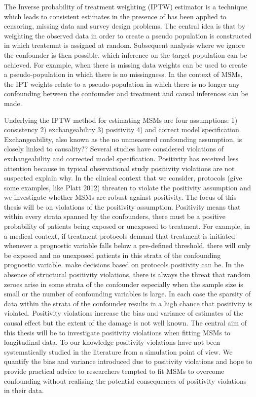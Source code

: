 \documentclass[11pt]{article}
\begin{document}
The Inverse probability of treatment weighting (IPTW) estimator is a
technique which leads to consistent estimates in the presence of has
been applied to censoring, missing data and survey design problems. The
central idea is that by weighting the observed data in order to create a
pseudo population is constructed in which treatemnt is assigned at
random. Subsequent analysis where we ignore the confounder is then
possible. which inference on the target population can be achieved. For
example, when there is missing data weights can be used to create a
pseudo-population in which there is no missingness. In the context of
MSMs, the IPT weights relate to a pseudo-population in which there is no
longer any confounding between the confounder and treatment and causal
inferences can be made. \linebreak

Underlying the IPTW method for estimating MSMs are four assumptions: 1)
consistency 2) exchangeability 3) positivity 4) and correct model
specification. Exchangeability, also known as the no unmeasured
confounding assumption, is closely linked to causality?? Several studies
have considered violations of exchangeability and corrected model
specification. Positivity has received less attention because in typical
observational study positivity violations are not suspected explain why.
In the clinical context that we consider, protocols (give some examples,
like Platt 2012) threaten to violate the positivity assumption and we
investigate whether MSMs are robust against positivity. The focus of
this thesis will be on violations of the positivity assumption.
Positivity means that within every strata spanned by the confounders,
there must be a positive probability of patients being exposed or
unexposed to treatment. For example, in a medical context, if treatment
protocols demand that treatment is initiated whenever a prognostic
variable falls below a pre-defined threshold, there will only be exposed
and no unexposed patients in this strata of the confounding prognostic
variable. make decisions based on protocols positivity can be. In the
absence of structural positivity violations, there is always the threat
that random zeroes arise in some strata of the confounder especially
when the sample size is small or the number of confounding variables is
large. In each case the sparsity of data within the strata of the
confounder results in a high chance that positivity is violated.
Positivity violations increase the bias and variance of estimates of the
causal effect but the extent of the damage is not well known. The
central aim of this thesis will be to investigate positivity violations
when fitting MSMs to longitudinal data. To our knowledge positivity
violations have not been systematically studied in the literature from a
simulation point of view. We quantify the bias and variance introduced
due to positivity violations and hope to provide practical advice to
researchers tempted to fit MSMs to overcome confounding without
realising the potential consequences of positivity violations in their
data. \linebreak
\end{document}
